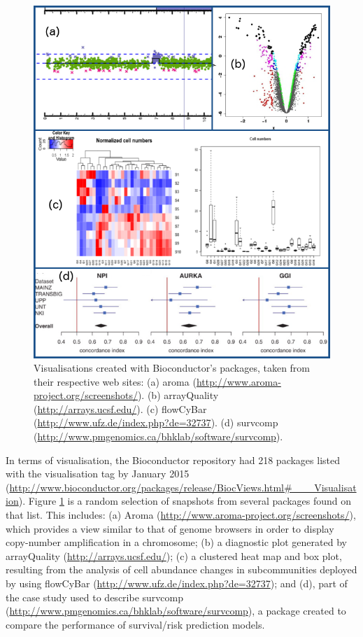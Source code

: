 \begin{figure}  
\centering
\includegraphics[width=\textwidth]{figures/bioconductor.png}
\caption[Visualisations created with Bioconductor's packages.]{Visualisations created with Bioconductor's packages, taken from their respective web sites: (a) aroma (\url{http://www.aroma-project.org/screenshots/}). (b) arrayQuality (\url{http://arrays.ucsf.edu/}). (c) flowCyBar (\url{http://www.ufz.de/index.php?de=32737}). (d) survcomp (\url{http://www.pmgenomics.ca/bhklab/software/survcomp}).
\label{fig:bioconductor}}
\end{figure}

In terms of visualisation, the Bioconductor repository had 218 packages listed with the visualisation tag by January 2015 (\url{http://www.bioconductor.org/packages/release/BiocViews.html#___Visualisation}). Figure \ref{fig:bioconductor} is a random selection of snapshots from several packages found on that list. This includes: (a) Aroma (\url{http://www.aroma-project.org/screenshots/}), which provides a view similar to that of genome browsers in order to display copy-number amplification in a chromosome; (b) a diagnostic plot generated by arrayQuality (\url{http://arrays.ucsf.edu/}); (c) a clustered heat map and box plot, resulting from the analysis of cell abundance changes in subcommunities deployed by using flowCyBar (\url{http://www.ufz.de/index.php?de=32737}); and (d), part of the case study used to describe survcomp (\url{http://www.pmgenomics.ca/bhklab/software/survcomp}), a package created to compare the performance of survival/risk prediction models. 


